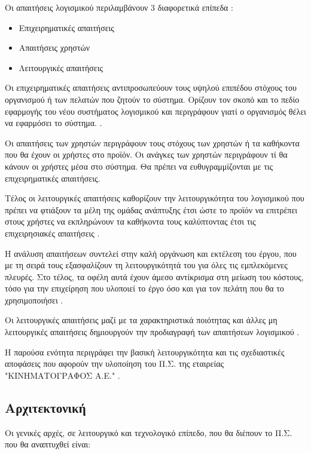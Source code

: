 \documentclass{assignment}
\begin{document}
Οι απαιτήσεις λογισμικού περιλαμβάνουν 3 διαφορετικά επίπεδα \cite{triadis}:

\begin{itemize}
\item Επιχειρηματικές απαιτήσεις
\item Απαιτήσεις χρηστών
\item Λειτουργικές απαιτήσεις
\end{itemize}

Οι επιχειρηματικές απαιτήσεις αντιπροσωπεύουν τους υψηλού επιπέδου στόχους του οργανισμού ή των πελατών που ζητούν το σύστημα. Ορίζουν τον σκοπό και το πεδίο εφαρμογής του νέου συστήματος λογισμικού και περιγράφουν γιατί ο οργανισμός θέλει να εφαρμόσει το σύστημα.  \cite{triadis}.

Οι απαιτήσεις των χρηστών περιγράφουν τους στόχους των χρηστών ή τα καθήκοντα που θα έχουν οι χρήστες στο προϊόν. Οι ανάγκες των χρηστών περιγράφουν τί θα κάνουν οι χρήστες μέσα στο σύστημα. Θα πρέπει να ευθυγραμμίζονται με τις επιχειρηματικές απαιτήσεις. \cite{triadis}

Τέλος οι λειτουργικές απαιτήσεις καθορίζουν την λειτουργικότητα του λογισμικού που πρέπει να φτιάξουν τα μέλη της ομάδας ανάπτυξης έτσι ώστε το προϊόν να επιτρέπει στους χρήστες να εκπληρώνουν τα καθήκοντα τους καλύπτοντας έτσι τις επιχειρησιακές απαιτήσεις \cite{triadis}.

Η ανάλυση απαιτήσεων συντελεί στην καλή οργάνωση και εκτέλεση του έργου, που με τη σειρά τους εξασφαλίζουν τη λειτουργικότητά του για όλες τις εμπλεκόμενες πλευρές. Στο τέλος, τα οφέλη αυτά έχουν άμεσο αντίκρισμα στη μείωση του κόστους, τόσο για την επιχείρηση που υλοποιεί το έργο όσο και για τον πελάτη που θα το χρησιμοποιήσει \cite{kepa:requirement_analysis}.

Οι λειτουργικές απαιτήσεις μαζί με τα χαρακτηριστικά ποιότητας και άλλες μη λειτουργικές απαιτήσεις δημιουργούν την προδιαγραφή των απαιτήσεων λογισμικού \cite{triadis}. 

Η παρούσα ενότητα περιγράφει την βασική λειτουργικότητα και τις σχεδιαστικές αποφάσεις που αφορούν την υλοποίηση του Π.Σ. της εταιρείας "ΚΙΝΗΜΑΤΟΓΡΑΦΟΣ Α.Ε." .

\subsection{Αρχιτεκτονική}

Οι γενικές αρχές, σε λειτουργικό και τεχνολογικό επίπεδο, που θα διέπουν το Π.Σ. που θα αναπτυχθεί είναι:
\end{document}
